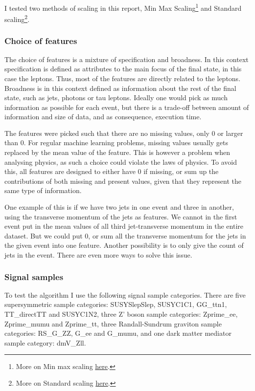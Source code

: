 \documentclass[ reprint, amsmath,amssymb, aps, nofootinbib]{revtex4-2}
\begin{document}
I tested two methods of scaling in this report, Min Max Scaling\footnote{More on Min max scaling \href{https://scikit-learn.org/stable/modules/generated/sklearn.preprocessing.MinMaxScaler.html}{here}.} and Standard scaling\footnote{More on Standard scaling \href{https://scikit-learn.org/stable/modules/generated/sklearn.preprocessing.StandardScaler.html}{here}.}\cite{scikit-learn}.

\subsubsection{Choice of features}
The choice of features is a mixture of specification and broadness. In this context specification is defined as attributes to the main focus of the final state, in this case the leptons. Thus, most of the features are directly related to the leptons. Broadness is in this context defined as information about the rest of the final state, such as jets, photons or tau leptons. Ideally one would pick as much information as possible for each event, but there is a trade-off between amount of information and size of data, and as consequence, execution time. \par 
The features were picked such that there are no missing values, only 0 or larger than 0. For regular machine learning problems, missing values usually gets replaced by the mean value of the feature. This is however a problem when analysing physics, as such a choice could violate the laws of physics. To avoid this, all features are designed to either have 0 if missing, or sum up the contributions of both missing and present values, given that they represent the same type of information. \par 
One example of this is if we have two jets in one event and three in another, using the transverse momentum of the jets as features. We cannot in the first event put in the mean values of all third jet-transverse momentum in the entire dataset. 
But we could put 0, or sum all the transverse momentum for the jets in the given event into one feature. Another possibility is to only give the count of jets in the event. There are even more ways to solve this issue. 


\subsubsection{Signal samples}
To test the algorithm I use the following signal sample categories. There are five supersymmetric sample categories: SUSYSlepSlep, SUSYC1C1, GG\_ttn1, TT\_directTT and SUSYC1N2\cite{DeSanto:2644352}, three Z' boson sample categories: Zprime\_ee, Zprime\_mumu and Zprime\_tt\cite{https://doi.org/10.48550/arxiv.1308.5874}, three Randall-Sundrum graviton sample categories: RS\_G\_ZZ, G\_ee and G\_mumu\cite{Randall_1999}, and one dark matter mediator sample category: dmV\_Zll. 
\end{document}

